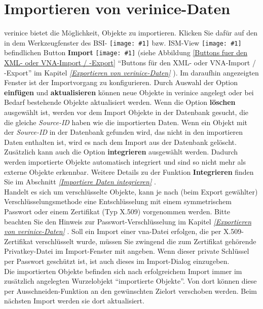 \documentclass[a4paper,10pt]{book}
\newcommand{\icon}[1]{\texttt{[image: \#1]}}
\begin{document}
\section{Importieren von verinice-Daten}
verinice bietet die Möglichkeit, Objekte zu importieren. Klicken Sie dafür auf den in dem Werkzeugfenster des BSI-
\icon{Icon/GS_Modell.png} bzw. ISM-View \icon{Icon/Informationssicherheitsmodell.png}
befindlichen Button \textbf{Import} \icon{Icon/Import.png} (siehe Abbildung \ref{Buttons fuer den XML- oder VNA-Import / -Export} ``Buttons für den XML- oder VNA-Import / -Export''
im Kapitel {\em \ref{Exportieren von verinice-Daten} }). Im daraufhin angezeigten Fenster ist der Importvorgang zu konfigurieren. Durch Auswahl der Option
\textbf{einfügen} und \textbf{aktualisieren}  können neue Objekte in verinice angelegt oder bei Bedarf bestehende Objekte aktualisiert werden. Wenn die Option
\textbf{löschen} ausgewählt ist, werden vor dem Import Objekte in der Datenbank gesucht, die die gleiche \textit{Source-ID} haben wie die importierten Daten. Wenn ein Objekt mit der \textit{Source-ID} in der Datenbank gefunden wird, das nicht in den importieren Daten enthalten ist, wird es nach dem Import aus der Datenbank gelöscht.
Zusätzlich kann auch die Option \textbf{integrieren} ausgewählt werden. Dadurch werden importierte Objekte automatisch integriert und sind so
nicht mehr als externe Objekte erkennbar. Weitere Details zu der Funktion \textbf{Integrieren} finden Sie im Abschnitt {\em \ref{Importiere Daten integrieren} }.
\newline\\
Handelt es sich um verschlüsselte Objekte, kann je nach (beim Export gewählter) Verschlüsselungsmethode eine Entschlüsselung mit einem symmetrischem Passwort oder
einem Zertifikat (Typ X.509) vorgenommen werden. Bitte beachten Sie den Hinweis
zur Passwort-Verschlüsselung im Kapitel {\em \ref{Exportieren von
verinice-Daten} }. Soll ein Import
einer vna-Datei erfolgen, die per X.509-Zertifikat verschlüsselt wurde, müssen
Sie zwingend die
zum Zertifikat gehörende Privatkey-Datei im Import-Fenster mit angeben. Wenn dieser private Schlüssel per Passwort geschützt ist, ist auch dieses im Import-Dialog einzugeben.
\newline\\
Die importierten Objekte befinden sich nach erfolgreichem Import immer im zusätzlich angelegten Wurzelobjekt ``importierte Objekte''. Von dort
können diese per Ausschneiden-Funktion an den gewünschten Zielort verschoben werden. Beim nächsten Import werden sie dort aktualisiert.
\end{document}
